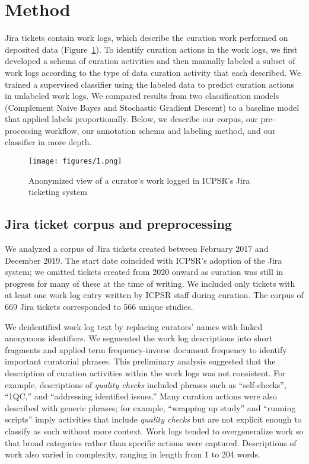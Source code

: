 \documentclass[conference]{IEEEtran}
\begin{document}
\section{Method}
\label{method}
Jira tickets contain work logs, which describe the curation work performed on deposited data (Figure~\ref{fig:figure1}). To identify curation actions in the work logs, we first developed a schema of curation activities and then manually labeled a subset of work logs according to the type of data curation activity that each described. We trained a supervised classifier using the labeled data to predict curation actions in unlabeled work logs. We compared results from two classification models (Complement Naive Bayes and Stochastic Gradient Descent) to a baseline model that applied labels proportionally. Below, we describe our corpus, our pre-processing workflow, our annotation schema and labeling method, and our classifier in more depth.

\begin{figure}[ht]
\texttt{[image: figures/1.png]}
\caption{Anonymized view of a curator’s work logged in ICPSR’s Jira ticketing system}
\label{fig:figure1}
\end{figure}

\subsection{Jira ticket corpus and preprocessing}
\label{jira-ticket-corpus}
We analyzed a corpus of Jira tickets created between February 2017 and December 2019. The start date coincided with ICPSR’s adoption of the Jira system; we omitted tickets created from 2020 onward as curation was still in progress for many of these at the time of writing. We included only tickets with at least one work log entry written by ICPSR staff during curation. The corpus of 669 Jira tickets corresponded to 566 unique studies.  

We deidentified work log text by replacing curators’ names with linked anonymous identifiers. We segmented the work log descriptions into short fragments and applied term frequency-inverse document frequency \cite{Sparck-jones1972-tq} to identify important curatorial phrases. This preliminary analysis suggested that the description of curation activities within the work logs was not consistent. For example, descriptions of \textit{quality checks} included phrases such as “self-checks”, “1QC,” and “addressing identified issues.” Many curation actions were also described with generic phrases; for example, “wrapping up study” and “running scripts” imply activities that include \textit{quality checks} but are not explicit enough to classify as such without more context. Work logs tended to overgeneralize work so that broad categories rather than specific actions were captured. Descriptions of work also varied in complexity, ranging in length from 1 to 204 words. 
\end{document}
